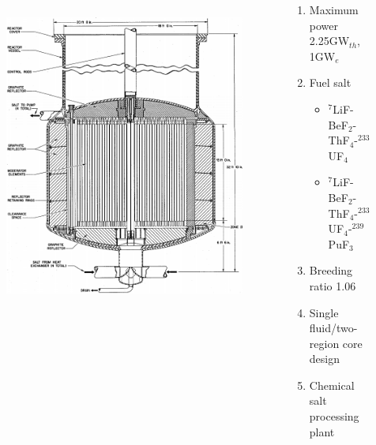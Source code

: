 \begin{frame}
\begin{columns}
\begin{figure}[t]
                \includegraphics[height=0.7\textwidth]{./images/msbr_plain.png}
                \vspace*{-0.2in}
      \end{figure}
   \begin{block}{ \cite{robertson_conceptual_1971}}
       \begin{enumerate}
       \item Maximum power 2.25GW$_{th}$, 1GW$_e$
       \item Fuel salt
         \begin{itemize}
         \item $^7$LiF-BeF$_2$-ThF$_4$-$^{233}$UF$_4$
         \item $^7$LiF-BeF$_2$-ThF$_4$-$^{233}$UF$_4$-$^{239}$PuF$_3$
         \end{itemize}  
       \item Breeding ratio 1.06
       \item Single fluid/two-region core design
       \item Chemical salt processing plant
      \end{enumerate}
     \end{block}
  \end{columns}
              
 \end{frame}

